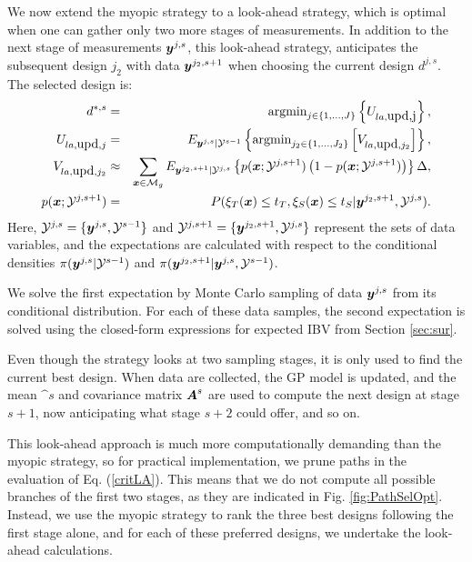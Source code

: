 \documentclass[aoas]{imsart}
\begin{document}
We now extend the myopic strategy to a look-ahead strategy, which is
optimal when one can gather only two more stages of measurements. In
addition to the next stage of measurements ${\boldsymbol y}^{j,s}$, this
look-ahead strategy, anticipates the subsequent design $j_2$ with
data ${\boldsymbol y}^{j_2,s+1}$ when choosing the current design $d^{j,s}$.  The
selected design is:
\begin{eqnarray}\label{critLA}
    d^{*,s} &=& \mbox{argmin}_{j \in \{1,\ldots,J\}} \left\{ U_{la,\mbox{upd,j}} \right\},  \\
    U_{la,\mbox{upd},j} & = &  E_{\by^{j,s}|\mathcal{Y}^{s-1}} \left\{ \mbox{argmin}_{j_2 \in \{1,\ldots,{J}_2\}} \left[ V_{la,\mbox{upd},j_2} \right] \right\}, \nonumber \\
V_{la,\mbox{upd},j_2} & \approx & \sum_{\bx \in \mathcal{M}_g} E_{\by^{j_2,s+1}|\mathcal{Y}^{j,s}} \left\{ p(\bx;\mathcal{Y}^{j,s+1})\left( 1-p(\bx;\mathcal{Y}^{j,s+1})\right) \right\} \Delta, \nonumber \\
    p(\bx;\mathcal{Y}^{j,s+1}) &=& P(\xi_T(\bx) \leq t_T, \xi_S(\bx) \leq t_S |\by^{j_2,s+1},\mathcal{Y}^{j,s}). \nonumber
\end{eqnarray}
Here, $\mathcal{Y}^{j,s}=\{{\boldsymbol y}^{j,s},\mathcal{Y}^{s-1}\}$ and
$\mathcal{Y}^{j,s+1}=\{{\boldsymbol y}^{j_2,s+1},\mathcal{Y}^{j,s}\}$ represent
the sets of data variables, and the expectations are calculated with respect to
the conditional densities $\pi({\boldsymbol y}^{j,s}|\mathcal{Y}^{s-1})$ and
$\pi({\boldsymbol y}^{j_2,s+1}|{\boldsymbol y}^{j,s},\mathcal{Y}^{s-1})$.

We solve the
first expectation by Monte Carlo sampling of data ${\boldsymbol y}^{j,s}$ from its
conditional distribution. For each of these data samples, the second expectation
is solved using the closed-form expressions for expected IBV from
Section \ref{sec:sur}.

Even though the strategy looks at two sampling stages, it is only used to find
the current best design. When data are collected, the GP model is
updated, and the mean $\bm^{s}$ and covariance matrix ${\boldsymbol A}^{s}$ are
used to compute the next design at stage $s+1$, now anticipating what
stage $s+2$ could offer, and so on.

This look-ahead approach is much more computationally demanding than
the myopic strategy, so for practical implementation, we prune paths
in the evaluation of Eq. (\ref{critLA}). This means that we do not
compute all possible branches of the first two stages, as they are
indicated in Fig. \ref{fig:PathSelOpt}. Instead, we use the myopic
strategy to rank the three best designs following the first stage alone, and
for each of these preferred designs, we undertake the look-ahead calculations.
\end{document}
